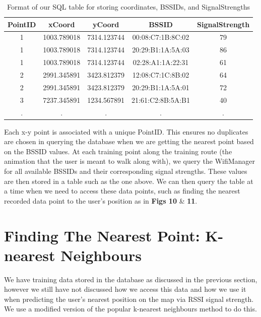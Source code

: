 \documentclass[10.8pt]{article}
\begin{document}
\vspace{1em}

\begin{table}[H]
\centering
\label{my-label}
\begin{tabular}{|c|c|c|c|c|}  \hline
\textbf{PointID} & \textbf{xCoord} & \textbf{yCoord} & \textbf{BSSID} & \textbf{SignalStrength} \\ \hline  \hline
1 & 1003.789018 & 7314.123744 &  00:08:C7:1B:8C:02 & 79 \\ \hline 
1 & 1003.789018 & 7314.123744 & 20:29:B1:1A:5A:03  & 86 \\ \hline
1 & 1003.789018 & 7314.123744 & 02:28:A1:1A:22:31  & 61 \\ \hline
2 & 2991.345891 & 3423.812379 & 12:08:C7:1C:8B:02   & 64 \\ \hline
2 & 2991.345891 & 3423.812379 &  20:29:B1:1A:5A:01  & 72 \\ \hline
3 & 7237.345891 & 1234.567891 & 21:61:C2:8B:5A:B1   & 40 \\ \hline
. & . & . & . & . \\ \hline
\end{tabular}
\caption{Format of our SQL table for storing coordinates, BSSIDs, and SignalStrengths}
\end{table}

Each x-y point is associated with a unique PointID. This ensures no duplicates are chosen in querying the database when we are getting the nearest point based on the BSSID values. At each training point along the training route (the animation that the user is meant to walk along with), we query the WifiManager for all available BSSIDs and their corresponding signal strengths. These values are then stored in a table such as the one above. We can then query the table at a time when we need to access these data points, such as finding the nearest recorded data point to the user's position as in \textbf{Figs 10} \& \textbf{11}.

\section*{Finding The Nearest Point: K-nearest Neighbours}

We have training data stored in the database as discussed in the previous section, however we still have not discussed how we access this data and how we use it when predicting the user's nearest position on the map via RSSI signal strength. We use a modified version of the popular k-nearest neighbours method to do this.
\end{document}
